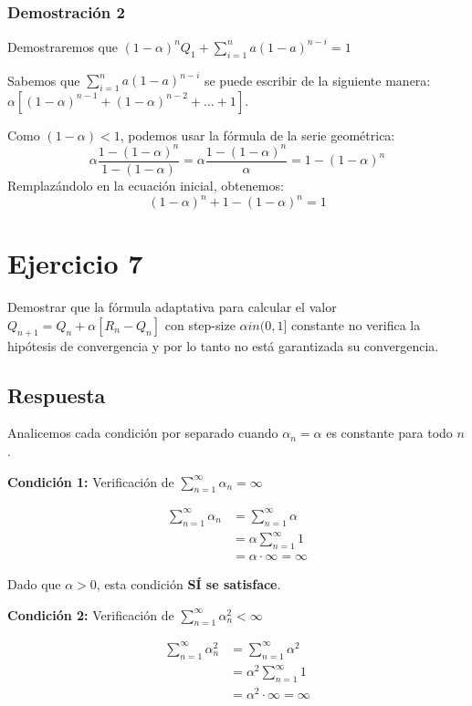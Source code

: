 \documentclass[12pt,a4paper]{article}
\begin{document}
\subsubsection{Demostración 2}

Demostraremos que $ (1-\alpha)^n Q_1 + \sum_{i=1}^{n} a(1-a)^{n-i} = 1 $

Sabemos que $\sum_{i=1}^{n} a(1-a)^{n-i}$ se puede escribir de la siguiente
manera: $\alpha [(1-\alpha)^{n-1} + (1-\alpha)^{n-2} + ... + 1]$.

Como $(1-\alpha)<1$, podemos usar la fórmula de la serie geométrica:
$$\alpha \frac{1-(1-\alpha)^{n}}{1-(1-\alpha)} = \alpha \frac{1-(1-\alpha)^{n}}{\alpha} = 1 - (1-\alpha)^{n}$$
Remplazándolo en la ecuación inicial, obtenemos:
$$(1-\alpha)^n + 1 - (1-\alpha)^{n} = 1$$

\section{Ejercicio 7}

Demostrar que la fórmula adaptativa para calcular el valor 
$Q_{n+1} = Q_n + \alpha [R_n - Q_n]$ con step-size $\alpha in (0,1]$
constante no verifica la hipótesis de convergencia y por lo tanto no
está garantizada su convergencia.

\subsection{Respuesta}

Analicemos cada condición por separado cuando $\alpha_n = \alpha$ es constante para todo $n$.

\textbf{Condición 1:} Verificación de $\sum_{n=1}^{\infty} \alpha_n = \infty$

\begin{align}
\sum_{n=1}^{\infty} \alpha_n &= \sum_{n=1}^{\infty} \alpha \\
&= \alpha \sum_{n=1}^{\infty} 1 \\
&= \alpha \cdot \infty = \infty
\end{align}

Dado que $\alpha > 0$, esta condición \textbf{SÍ se satisface}.

\textbf{Condición 2:} Verificación de $\sum_{n=1}^{\infty} \alpha_n^2 < \infty$

\begin{align}
\sum_{n=1}^{\infty} \alpha_n^2 &= \sum_{n=1}^{\infty} \alpha^2 \\
&= \alpha^2 \sum_{n=1}^{\infty} 1 \\
&= \alpha^2 \cdot \infty = \infty
\end{align}
\end{document}
